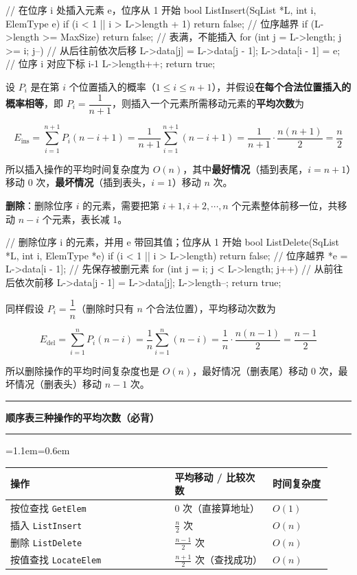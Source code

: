 \documentclass[11pt,openany,UTF8]{ctexbook}
\newcommand{\callouthead}[2]{%
  \par\addvspace{7pt}\noindent
  {\color{#1}\rule[-0.15em]{3pt}{1.05em}}\hspace{0.5em}%
  {\bfseries\color{#1}#2}\par\nobreak\vspace{-0.35em}%
  {\color{rulesep}\hrule height 0.4pt}\nobreak\vspace{0.45em}%
  \begingroup\small\setlength{\parindent}{0pt}%
  \leftskip=1.1em\rightskip=0.6em\noindent\ignorespaces}
\newcommand{\calloutend}{\par\endgroup\addvspace{7pt}}
\newenvironment{callkey}[1]{\callouthead{keybar}{#1}}{\calloutend}
\begin{document}
\begin{codebox}
// 在位序 i 处插入元素 e，位序从 1 开始
bool ListInsert(SqList *L, int i, ElemType e) {
    if (i < 1 || i > L->length + 1) return false; // 位序越界
    if (L->length >= MaxSize)        return false; // 表满，不能插入
    for (int j = L->length; j >= i; j--) {         // 从后往前依次后移
        L->data[j] = L->data[j - 1];
    }
    L->data[i - 1] = e;   // 位序 i 对应下标 i-1
    L->length++;
    return true;
}
\end{codebox}

设 $P_i$ 是在第 $i$ 个位置插入的概率（$1 \le i \le n+1$），并假设\textbf{在每个合法位置插入的概率相等}，即 $P_i = \dfrac{1}{n+1}$，则插入一个元素所需移动元素的\textbf{平均次数}为

\[E_{\text{ins}} = \sum_{i=1}^{n+1} P_i (n-i+1) = \frac{1}{n+1}\sum_{i=1}^{n+1}(n-i+1) = \frac{1}{n+1}\cdot\frac{n(n+1)}{2} = \frac{n}{2}\]

所以插入操作的平均时间复杂度为 $O(n)$，其中\textbf{最好情况}（插到表尾，$i=n+1$）移动 0 次，\textbf{最坏情况}（插到表头，$i=1$）移动 $n$ 次。

\textbf{删除}：删除位序 $i$ 的元素，需要把第 $i+1, i+2, \cdots, n$ 个元素整体前移一位，共移动 $n-i$ 个元素，表长减 1。

\begin{codebox}
// 删除位序 i 的元素，并用 e 带回其值；位序从 1 开始
bool ListDelete(SqList *L, int i, ElemType *e) {
    if (i < 1 || i > L->length) return false;   // 位序越界
    *e = L->data[i - 1];                        // 先保存被删元素
    for (int j = i; j < L->length; j++) {       // 从前往后依次前移
        L->data[j - 1] = L->data[j];
    }
    L->length--;
    return true;
}
\end{codebox}

同样假设 $P_i = \dfrac{1}{n}$（删除时只有 $n$ 个合法位置），平均移动次数为

\[E_{\text{del}} = \sum_{i=1}^{n} P_i (n-i) = \frac{1}{n}\sum_{i=1}^{n}(n-i) = \frac{1}{n}\cdot\frac{n(n-1)}{2} = \frac{n-1}{2}\]

所以删除操作的平均时间复杂度也是 $O(n)$，最好情况（删表尾）移动 0 次，最坏情况（删表头）移动 $n-1$ 次。

\begin{callkey}{顺序表三种操作的平均次数（必背）}
\begingroup\small\setlength{\tabcolsep}{4.0pt}
\begin{longtable}{@{}L{0.4728\linewidth}L{0.2837\linewidth}L{0.1719\linewidth}@{}}
\toprule
\textbf{操作} & \textbf{平均移动 / 比较次数} & \textbf{时间复杂度} \\
\midrule
\endhead
按位查找 \texttt{GetElem} & 0 次（直接算地址） & $O(1)$ \\
插入 \texttt{ListInsert} & $\frac{n}{2}$ 次 & $O(n)$ \\
删除 \texttt{ListDelete} & $\frac{n-1}{2}$ 次 & $O(n)$ \\
按值查找 \texttt{LocateElem} & $\frac{n+1}{2}$ 次（查找成功） & $O(n)$ \\
\bottomrule
\end{longtable}
\endgroup

\end{callkey}
\end{document}
